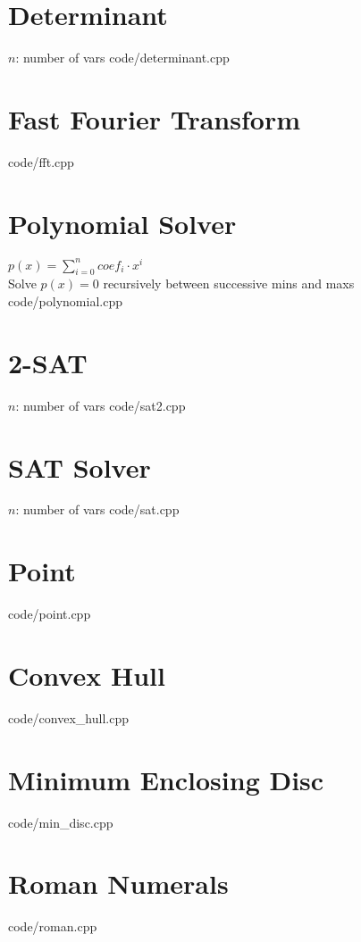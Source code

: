\documentclass [landscape,8pt,a4paper,twocolumn]{article}
\begin{document}
\section{Determinant}
$ n $: number of vars
 {code/determinant.cpp}

\section{Fast Fourier Transform}
 {code/fft.cpp}

\vfill\null

\section{Polynomial Solver}
$ p(x)=\sum_{i=0}^{n} coef_i \cdot x^i $ \\
Solve $ p(x)=0 $ recursively between successive mins and maxs
 {code/polynomial.cpp}

\vfill\null

\section{2-SAT}
$ n $: number of vars
 {code/sat2.cpp}

\section{SAT Solver}
$ n $: number of vars
 {code/sat.cpp}

\section{Point}
 {code/point.cpp}

\section{Convex Hull}
 {code/convex_hull.cpp}

\section{Minimum Enclosing Disc}
 {code/min_disc.cpp}

\section{Roman Numerals}
 {code/roman.cpp}
\end{document}
